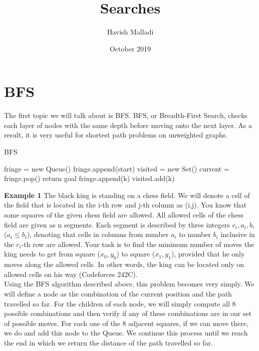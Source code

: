 \documentclass[11pt]{article}
\title{Searches}
\author{Havish Malladi}
\date{October 2019}
\begin{document}
\maketitle



\section{BFS}
The first topic we will talk about is BFS. BFS, or Breadth-First Search, checks each layer of nodes with the same depth before moving onto the next layer. As a result, it is very useful for shortest path problems on unweighted graphs.
\begin{algorithm} 
        \caption{BFS}\label{alg:prop}
        \begin{algorithmic}[1]
        \State fringe = new Queue()%
        \State fringe.append(start)%
        \State visited = new Set()%
            current = fringe.pop()
                return goal
            \EndIf
                    \State fringe.append(k)
                    \State visited.add(k)
                \EndIf
            \EndFor
        \EndWhile
        \end{algorithmic}
        \end{algorithm} 
        
\textbf{Example 1} 
The black king is standing on a chess field. We will denote a cell of the field that is located in the i-th row and j-th column as (i,j). You know that some squares of the given chess field are allowed. All allowed cells of the chess field are given as n segments. Each segment is described by three integers $r_i, a_i, b_i$ ($a_i\leq b_i$), denoting that cells in columns from number $a_i$ to number $b_i$ inclusive in the $r_i$-th row are allowed. Your task is to find the minimum number of moves the king needs to get from square ($x_0, y_0$) to square ($x_1, y_1$), provided that he only moves along the allowed cells. In other words, the king can be located only on allowed cells on his way (Codeforces 242C).\\

Using the BFS algorithm described above, this problem becomes very simply. We will define a node as the combination of the current position and the path travelled so far. For the children of each node, we will simply compute all 8 possible combinations and then verify if any of these combinations are in our set of possible moves. For each one of the 8 adjacent squares, if we can move there, we do and add this node to the Queue. We continue this process until we reach the end in which we return the distance of the path travelled so far. \\
\end{document}
